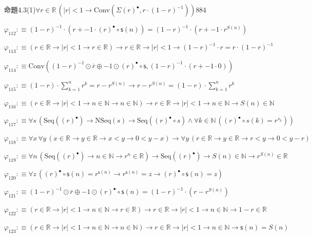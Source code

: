 \begin{fullproof}{命題4.3(1)}{$\forall r \in \mathbb{R}\,(\lvert r \rvert < 1 \to \mathrm{Conv}(\Sigma {(r)^{\bullet}},r \cdot (1 - r)^{-1}))$}{884}
\begin{abbrevlist}
\item $\varphi_{112} :\equiv (1 - r)^{-1} \cdot (r + -1 \cdot {(r)^{\bullet}} \circ \mathsf{s}(n)) = (1 - r)^{-1} \cdot (r + -1 \cdot {{r}^{S(n)}})$
\item $\varphi_{113} :\equiv (r \in \mathbb{R} \to \lvert r \rvert < 1 \to r \in \mathbb{R}) \to r \in \mathbb{R} \to \lvert r \rvert < 1 \to (1 - r)^{-1} \cdot r = r \cdot (1 - r)^{-1}$
\item $\varphi_{114} :\equiv \mathrm{Conv}((1 - r)^{-1} \odot \overline{r} \oplus -1 \odot {(r)^{\bullet}} \circ \mathsf{s},(1 - r)^{-1} \cdot (r + -1 \cdot 0))$
\item $\varphi_{115} :\equiv (1 - r) \cdot {\textstyle\sum_{k=1}^{n} {{r}^{k}}} = r - {{r}^{S(n)}} \to r - {{r}^{S(n)}} = (1 - r) \cdot {\textstyle\sum_{k=1}^{n} {{r}^{k}}}$
\item $\varphi_{116} :\equiv (r \in \mathbb{R} \to \lvert r \rvert < 1 \to n \in \mathbb{N} \to n \in \mathbb{N}) \to r \in \mathbb{R} \to \lvert r \rvert < 1 \to n \in \mathbb{N} \to S(n) \in \mathbb{N}$
\item $\varphi_{117} :\equiv \forall s\,(\mathrm{Seq}({(r)^{\bullet}}) \to \mathrm{NSeq}(s) \to \mathrm{Seq}({(r)^{\bullet}} \circ s) \land \forall k \in \mathbb{N}\,({(r)^{\bullet}} \circ s(k) = {{r}^{s_{k}}}))$
\item $\varphi_{118} :\equiv \forall x\,\forall y\,(x \in \mathbb{R} \to y \in \mathbb{R} \to x < y \to 0 < y - x) \to \forall y\,(r \in \mathbb{R} \to y \in \mathbb{R} \to r < y \to 0 < y - r)$
\item $\varphi_{119} :\equiv \forall n\,(\mathrm{Seq}({(r)^{\bullet}}) \to n \in \mathbb{N} \to {{r}^{n}} \in \mathbb{R}) \to \mathrm{Seq}({(r)^{\bullet}}) \to S(n) \in \mathbb{N} \to {{r}^{S(n)}} \in \mathbb{R}$
\item $\varphi_{120} :\equiv \forall z\,({(r)^{\bullet}} \circ \mathsf{s}(n) = {{r}^{\mathsf{s}(n)}} \to {{r}^{\mathsf{s}(n)}} = z \to {(r)^{\bullet}} \circ \mathsf{s}(n) = z)$
\item $\varphi_{121} :\equiv (1 - r)^{-1} \odot \overline{r} \oplus -1 \odot {(r)^{\bullet}} \circ \mathsf{s}(n) = (1 - r)^{-1} \cdot (r - {{r}^{S(n)}})$
\item $\varphi_{122} :\equiv (r \in \mathbb{R} \to \lvert r \rvert < 1 \to n \in \mathbb{N} \to r \in \mathbb{R}) \to r \in \mathbb{R} \to \lvert r \rvert < 1 \to n \in \mathbb{N} \to 1 - r \in \mathbb{R}$
\item $\varphi_{123} :\equiv (r \in \mathbb{R} \to \lvert r \rvert < 1 \to n \in \mathbb{N} \to n \in \mathbb{N}) \to r \in \mathbb{R} \to \lvert r \rvert < 1 \to n \in \mathbb{N} \to \mathsf{s}(n) = S(n)$

\end{abbrevlist}
\end{fullproof}
